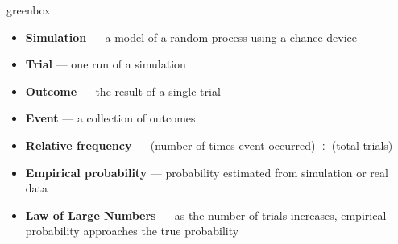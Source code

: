 \documentclass[10pt]{article}
\begin{document}
\begin{skillbox}{greenbox}
\begin{minipage}[t]{0.48\linewidth}
    \begin{itemize}
        \item \textbf{Simulation} --- a model of a random process using a chance device
        \item \textbf{Trial} --- one run of a simulation
        \item \textbf{Outcome} --- the result of a single trial
        \item \textbf{Event} --- a collection of outcomes
    \end{itemize}
\end{minipage}
\hfill
\begin{minipage}[t]{0.48\linewidth}
    \begin{itemize}
        \item \textbf{Relative frequency} --- (number of times event occurred) $\div$ (total trials)
        \item \textbf{Empirical probability} --- probability estimated from simulation or real data
        \item \textbf{Law of Large Numbers} --- as the number of trials increases, empirical
              probability approaches the true probability
    \end{itemize}
\end{minipage}
\end{skillbox}
\end{document}
